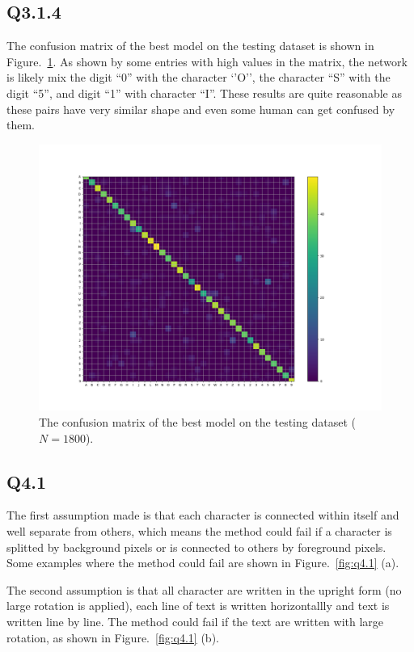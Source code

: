 \documentclass[11pt]{article}
\begin{document}
\newpage

\subsection*{Q3.1.4}

The confusion matrix of the best model on the testing dataset is shown in Figure.~\ref{fig:q3.1.4}. As shown by some entries with high values in the matrix, the network is likely mix the digit ``0'' with the character `'O'', the character ``S'' with the digit ``5'', and digit ``1'' with character ``I''. These results are quite reasonable as these pairs have very similar shape and even some human can get confused by them.

\begin{figure}[h!]
    \centering
    \includegraphics[width=.8\linewidth]{../results/q3_1_4.png}
    \caption{The confusion matrix of the best model on the testing dataset ($N=1800$). }
    \label{fig:q3.1.4}
\end{figure}

\newpage

\subsection*{Q4.1}

The first assumption made is that each character is connected within itself and well separate from others, which means the method could fail if a character is splitted by background pixels or is connected to others by foreground pixels. Some examples where the method could fail are shown in Figure.~\ref{fig:q4.1} (a).

The second assumption is that all character are written in the upright form (no large rotation is applied), each line of text is written horizontallly and text is written line by line. The method could fail if the text are written with large rotation, as shown in Figure.~\ref{fig:q4.1} (b).
\end{document}
